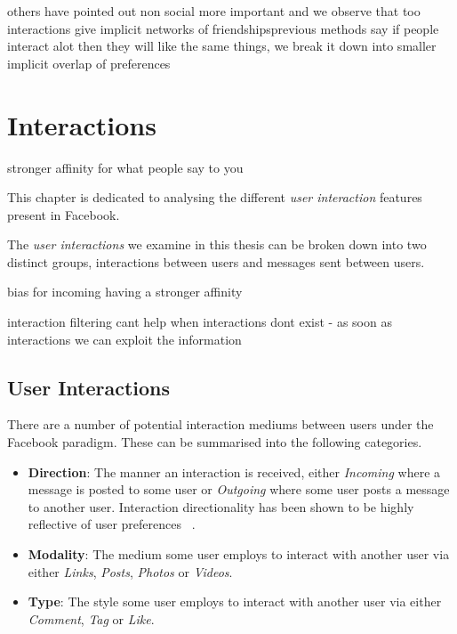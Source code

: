 

others have pointed out non social more important and we observe that too
interactions give implicit networks of friendshipsprevious methods say if people interact alot then they will like the same things, 
we break it down into smaller implicit overlap of preferences

\chapter{Interactions}
\label{cha:interactions}

stronger affinity for what people say to you

This chapter is dedicated to analysing the different \emph{user interaction} features present in Facebook.

The \emph{user interactions} we examine in this thesis can be broken down into two distinct groups, interactions between users and messages 
sent between users.

bias for incoming having a stronger affinity

interaction filtering cant help when interactions dont exist - as soon as interactions we can exploit the information

\section{User Interactions}
\label{sec:inter}

There are a number of potential interaction mediums between users under the Facebook paradigm. These can be summarised into the following 
categories.

\begin{itemize}
\item \textbf{Direction}: The manner an interaction is received, either \emph{Incoming} where a message is posted to some user or 
\emph{Outgoing} where some user posts a message to another user. Interaction directionality has been shown to be highly 
reflective of user preferences ~\cite{saez2011high}.
\item \textbf{Modality}: The medium some user employs to interact with another user via either \emph{Links}, \emph{Posts}, \emph{Photos} or \emph{Videos}.
\item \textbf{Type}: The style some user employs to interact with another user via either \emph{Comment}, \emph{Tag} or \emph{Like}.
\end{itemize}

